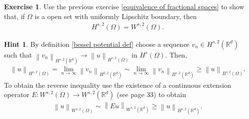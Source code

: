 \documentclass[
    a4paper,
    DIV=14,
    abstract=true,
    numbers=noenddot
]
{scrartcl}
\theoremstyle{definition}
\newtheorem{exercise}{Exercise}
\newtheorem*{hint}{Hint}
\renewcommand{\norm}[1]{\left\lVert #1 \right\rVert}\renewcommand{\abs}[1]{\left| #1 \right|}
\newcommand{\R}{\mathbb{R}}
\begin{document}
\begin{exercise}
  Use the previous exercise \ref{equivalence of fractional spaces} to show that, if $\Omega $ is a open set with uniformly Lipschitz boundary, then
  \begin{align*}
    H^{s,2}(\Omega )=W^{s,2}(\Omega ).
  \end{align*}
\end{exercise}
\begin{hint}
  By definition \ref{bessel potential def} choose a sequence $v_n \in H^{s,2}(\R^d)$ such that $\norm{v_n}_{H^{s,2}(\R^d)} \to \norm{u}_{H^{s,2}(\Omega )}$ in $H^s(\Omega )$. Then,
  \begin{align*}
    \norm{u}_{H^{s,2}(\Omega)}= \lim_{n\to\infty}\norm{v_n}_{H^{2,2}(\R^d)}\sim \lim_{n\to\infty}\norm{v_n}_{B^{s,2}(\R^d)}\geq \norm{u}_{B^{s,2}(\Omega )}.
  \end{align*}
  To obtain the reverse inequality use the existence of a continuous extension operator $E:W^{s,2}(\Omega )\to W^{s,2}(\R^d)$ (see \cite{di2012hitchhiker's} page 33) to obtain
  \begin{align*}
    \norm{u}_{W^{s,2}(\Omega )}\sim \norm{Eu}_{W^{s,2}(\R^d)}\geq \norm{u}_{H^{s,2}(\R^d)}.
  \end{align*}

\end{hint}
\end{document}
